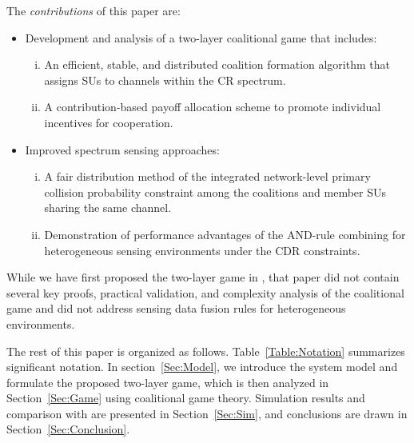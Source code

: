 \documentclass[journal,draftclsnofoot,onecolumn]{IEEEtran}
\theoremstyle{definition}
\begin{document}
The \textit{contributions} of this paper are:
\begin{itemize}
	\item Development and analysis of a two-layer coalitional game that includes:
	\begin{enumerate}[(i)]
		\item An efficient, stable, and distributed coalition formation algorithm that assigns SUs to channels within the CR spectrum.
		\item A contribution-based payoff allocation scheme to promote individual incentives for cooperation.
	\end{enumerate}
  \item Improved spectrum sensing approaches:
	\begin{enumerate}[(i)]
		\item A fair distribution method of the integrated network-level primary collision probability constraint among the coalitions and member SUs sharing the same channel.
		\item Demonstration of performance advantages of the AND-rule combining for heterogeneous sensing environments under the CDR constraints. 
	\end{enumerate}
\end{itemize}
While we have first proposed the two-layer game in \cite{YLuCISS}, that paper did not contain several key proofs, practical validation, and complexity analysis of the coalitional game and did not address sensing data fusion rules for heterogeneous environments.

The rest of this paper is organized as follows. Table~\ref{Table:Notation} summarizes significant notation. In section~\ref{Sec:Model}, we introduce the system model and formulate the proposed two-layer game, which is then analyzed in Section~\ref{Sec:Game} using coalitional game theory. Simulation results and comparison with \cite{HedonicSenseGame} are presented in Section~\ref{Sec:Sim}, and conclusions are drawn in Section~\ref{Sec:Conclusion}.
\end{document}
